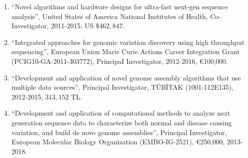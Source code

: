 

\begin{enumerate}
\item
   ``Novel algorithms and hardware designs for ultra-fast next-gen sequence analysis'', United States of America National Institutes of Health, Co-Investigator, 2011-2015. US $\$462,847$. 
\item ``Integrated approaches for genomic variation discovery using high throughput sequencing'', European Union Marie Curie Actions Career Integration Grant (PCIG10-GA-2011-303772), PrincipaI Investigator, 2012-2016,  \euro{100,000}.
\item ``Development and application of novel genome assembly algorithms that use multiple data sources'', Principal Investigator, TÜBİTAK (1001-112E135), 2012-2015, $313,152$ TL.
\item ``Development and application of computational methods to analyze next generation sequence data to characterize both normal and disease causing variation, and build de novo genome assemblies'', Principal Investigator, European Molecular Biology Organization (EMBO-IG-2521), \euro{250,000}, 2013-2018.
\end{enumerate}
